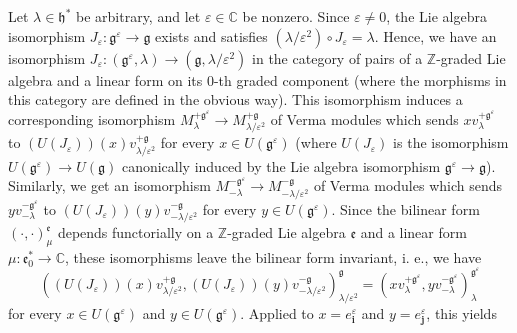 \documentclass
[numbers=enddot,12pt,final,onecolumn,german,notitlepage]{scrartcl}%
\theoremstyle{definition}
\begin{document}
Let $\lambda\in\mathfrak{h}^{\ast}$ be arbitrary, and let $\varepsilon
\in\mathbb{C}$ be nonzero. Since $\varepsilon\neq0$, the Lie algebra
isomorphism $J_{\varepsilon}:\mathfrak{g}^{\varepsilon}\rightarrow
\mathfrak{g}$ exists and satisfies $\left(  \lambda/\varepsilon^{2}\right)
\circ J_{\varepsilon}=\lambda$. Hence, we have an isomorphism $J_{\varepsilon
}:\left(  \mathfrak{g}^{\varepsilon},\lambda\right)  \rightarrow\left(
\mathfrak{g},\lambda/\varepsilon^{2}\right)  $ in the category of pairs of a
$\mathbb{Z}$-graded Lie algebra and a linear form on its $0$-th graded
component (where the morphisms in this category are defined in the obvious
way). This isomorphism induces a corresponding isomorphism $M_{\lambda
}^{+\mathfrak{g}^{\varepsilon}}\rightarrow M_{\lambda/\varepsilon^{2}%
}^{+\mathfrak{g}}$ of Verma modules which sends $xv_{\lambda}^{+\mathfrak{g}%
^{\varepsilon}}$ to $\left(  U\left(  J_{\varepsilon}\right)  \right)  \left(
x\right)  v_{\lambda/\varepsilon^{2}}^{+\mathfrak{g}}$ for every $x\in
U\left(  \mathfrak{g}^{\varepsilon}\right)  $ (where $U\left(  J_{\varepsilon
}\right)  $ is the isomorphism $U\left(  \mathfrak{g}^{\varepsilon}\right)
\rightarrow U\left(  \mathfrak{g}\right)  $ canonically induced by the Lie
algebra isomorphism $\mathfrak{g}^{\varepsilon}\rightarrow\mathfrak{g}$).
Similarly, we get an isomorphism $M_{-\lambda}^{-\mathfrak{g}^{\varepsilon}%
}\rightarrow M_{-\lambda/\varepsilon^{2}}^{-\mathfrak{g}}$ of Verma modules
which sends $yv_{-\lambda}^{-\mathfrak{g}^{\varepsilon}}$ to $\left(  U\left(
J_{\varepsilon}\right)  \right)  \left(  y\right)  v_{-\lambda/\varepsilon
^{2}}^{-\mathfrak{g}}$ for every $y\in U\left(  \mathfrak{g}^{\varepsilon
}\right)  $. Since the bilinear form $\left(  \cdot,\cdot\right)  _{\mu
}^{\mathfrak{e}}$ depends functorially on a $\mathbb{Z}$-graded Lie algebra
$\mathfrak{e}$ and a linear form $\mu:\mathfrak{e}_{0}^{\ast}\rightarrow
\mathbb{C}$, these isomorphisms leave the bilinear form invariant, i. e., we
have%
\[
\left(  \left(  U\left(  J_{\varepsilon}\right)  \right)  \left(  x\right)
v_{\lambda/\varepsilon^{2}}^{+\mathfrak{g}},\left(  U\left(  J_{\varepsilon
}\right)  \right)  \left(  y\right)  v_{-\lambda/\varepsilon^{2}%
}^{-\mathfrak{g}}\right)  _{\lambda/\varepsilon^{2}}^{\mathfrak{g}}=\left(
xv_{\lambda}^{+\mathfrak{g}^{\varepsilon}},yv_{-\lambda}^{-\mathfrak{g}%
^{\varepsilon}}\right)  _{\lambda}^{\mathfrak{g}^{\varepsilon}}%
\]
for every $x\in U\left(  \mathfrak{g}^{\varepsilon}\right)  $ and $y\in
U\left(  \mathfrak{g}^{\varepsilon}\right)  $. Applied to $x=e_{\mathbf{i}%
}^{\varepsilon}$ and $y=e_{\mathbf{j}}^{\varepsilon}$, this yields%
\end{document}
